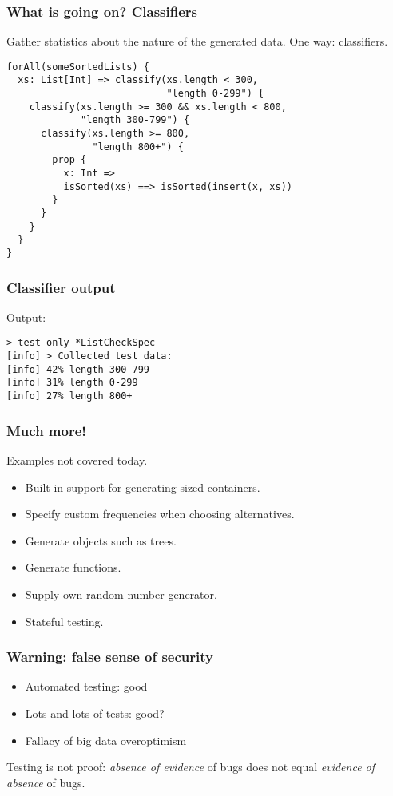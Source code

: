 \documentclass{beamer}
\begin{document}
\begin{frame}[fragile]
  \frametitle{What is going on? Classifiers}

  Gather statistics about the nature of the generated data. One way: classifiers.

  \begin{verbatim}
forAll(someSortedLists) {
  xs: List[Int] => classify(xs.length < 300,
                            "length 0-299") {
    classify(xs.length >= 300 && xs.length < 800,
             "length 300-799") {
      classify(xs.length >= 800,
               "length 800+") {
        prop {
          x: Int =>
          isSorted(xs) ==> isSorted(insert(x, xs))
        }
      }
    }
  }
}
  \end{verbatim}
\end{frame}

\begin{frame}[fragile]
  \frametitle{Classifier output}

  Output:
  \begin{verbatim}
> test-only *ListCheckSpec
[info] > Collected test data: 
[info] 42% length 300-799
[info] 31% length 0-299
[info] 27% length 800+
  \end{verbatim}
\end{frame}

\begin{frame}[fragile]
  \frametitle{Much more!}

  Examples not covered today.

  \begin{itemize}
    \item<1-> Built-in support for generating sized containers.
    \item<2-> Specify custom frequencies when choosing alternatives.
    \item<3-> Generate objects such as trees.
    \item<4-> Generate functions.
    \item<5-> Supply own random number generator.
    \item<6-> Stateful testing.
  \end{itemize}
\end{frame}

\begin{frame}
  \frametitle{Warning: false sense of security}

  \begin{itemize}
    \item Automated testing: good
    \item Lots and lots of tests: good?
    \item Fallacy of \href{http://radar.oreilly.com/2013/04/data-skepticism.html}{big data overoptimism}
  \end{itemize}

  Testing is not proof: \emph{absence of evidence} of bugs does not equal \emph{evidence of absence} of bugs.
\end{frame}
\end{document}
